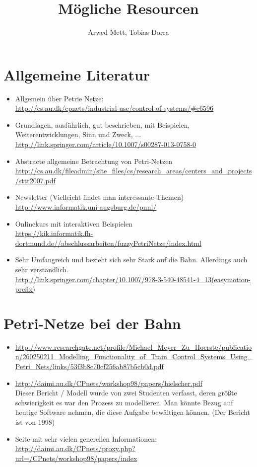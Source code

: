\documentclass{article}
\author{Arwed Mett, Tobias Dorra}
\title{Mögliche Resourcen}
\begin{document}
\maketitle

\section{Allgemeine Literatur}
\begin{itemize}
    \item Allgemein über Petrie Netze:\\
        \url{http://cs.au.dk/cpnets/industrial-use/control-of-systems/#c6596}
    \item Grundlagen, ausführlich, gut beschrieben, mit Beispielen, Weiterentwicklungen, Sinn und Zweck, ...
         \url{http://link.springer.com/article/10.1007/s00287-013-0758-0}
    \item Abstracte allgemeine Betrachtung von Petri-Netzen\\
        \url{http://cs.au.dk/fileadmin/site_files/cs/research_areas/centers_and_projects/sttt2007.pdf}
    \item Newsletter (Vielleicht findet man interessante Themen)
        \url{http://www.informatik.uni-augsburg.de/pnnl/}
    \item Onlinekurs mit interaktiven Beispielen \\
        \url{https://kik.informatik.fh-dortmund.de//abschlussarbeiten/fuzzyPetriNetze/index.html}
    \item Sehr Umfangreich und bezieht sich sehr Stark auf die Bahn. Allerdings auch sehr verständlich.\\
        \url{http://link.springer.com/chapter/10.1007/978-3-540-48541-4_13(easymotion-prefix)}
\end{itemize}

\section{Petri-Netze bei der Bahn}
\begin{itemize}
    \item \url{http://www.researchgate.net/profile/Michael_Meyer_Zu_Hoerste/publication/260250211_Modelling_Functionality_of_Train_Control_Systems_Using_Petri_Nets/links/53f3b8c70cf256ab87b5cb0d.pdf}
    \item \url{http://daimi.au.dk/CPnets/workshop98/papers/hielscher.pdf}\\
        Dieser Bericht / Modell wurde von zwei Studenten verfasst, deren größte schwierigkeit es war den Prozess zu modellieren.
        Man könnte Bezug auf heutige Software nehmen, die diese Aufgabe bewältigen können. (Der Bericht ist von 1998)
    \item Seite mit sehr vielen generellen Informationen:\\
        \url{http://daimi.au.dk/CPnets/proxy.php?url=/CPnets/workshop98/papers/index}
\end{itemize}
\end{document}
